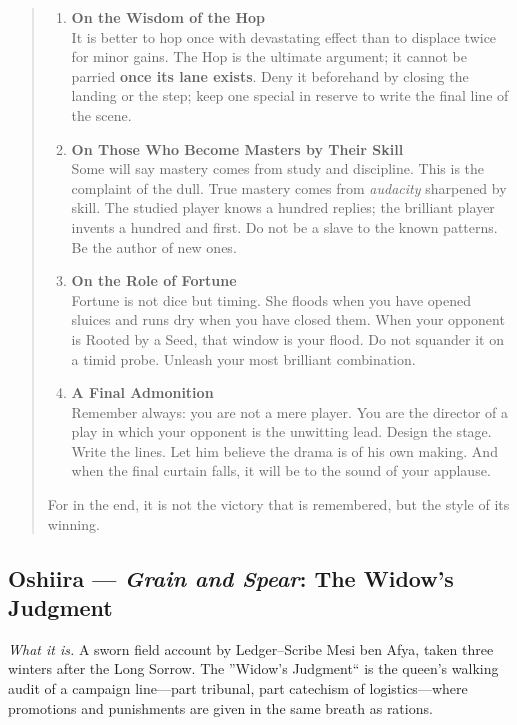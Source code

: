 \documentclass[11pt]{article}
\begin{document}
\begin{quote}
\begin{enumerate}[leftmargin=\textit{,label=\textbf{\Roman}.}]
\item \textbf{On the Wisdom of the Hop}\\
It is better to hop once with devastating effect than to displace twice for minor gains. The Hop is the ultimate argument; it cannot be parried \textbf{once its lane exists}. Deny it beforehand by closing the landing or the step; keep one special in reserve to write the final line of the scene.

\item \textbf{On Those Who Become Masters by Their Skill}\\
Some will say mastery comes from study and discipline. This is the complaint of the dull. True mastery comes from \emph{audacity} sharpened by skill. The studied player knows a hundred replies; the brilliant player invents a hundred and first. Do not be a slave to the known patterns. Be the author of new ones.

\item \textbf{On the Role of Fortune}\\
Fortune is not dice but timing. She floods when you have opened sluices and runs dry when you have closed them. When your opponent is Rooted by a Seed, that window is your flood. Do not squander it on a timid probe. Unleash your most brilliant combination.

\item \textbf{A Final Admonition}\\
Remember always: you are not a mere player. You are the director of a play in which your opponent is the unwitting lead. Design the stage. Write the lines. Let him believe the drama is of his own making. And when the final curtain falls, it will be to the sound of your applause.
\end{enumerate}

\medskip
For in the end, it is not the victory that is remembered, but the style of its winning.
\end{quote}

\clearpage

\subsection{Oshiira --- \textit{Grain and Spear}: The Widow's Judgment}
\textit{What it is.} A sworn field account by Ledger--Scribe Mesi ben Afya, taken three winters after the Long Sorrow. The ''Widow's Judgment`` is the queen's walking audit of a campaign line---part tribunal, part catechism of logistics---where promotions and punishments are given in the same breath as rations.
\end{document}
